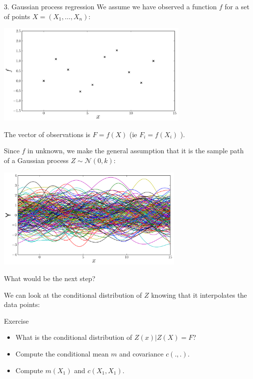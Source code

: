 \documentclass{beamer}
\begin{document}
\begin{frame}{3. Gaussian process regression}
We assume we have observed a function $f$ for a set of points $X = (X_1,\dots,X_n)$:
\begin{center}
\includegraphics[height=5cm]{figures/R/Fig1-data}
\end{center}
The vector of observations is $F=f(X)$ (ie $F_i = f(X_i)$ ).
\end{frame}

\begin{frame}{}
Since $f$ in unknown, we make the general assumption that
it is the sample path of a Gaussian process $Z \sim \mathcal{N}(0,k)$:
\begin{center}
\includegraphics[height=5cm]{figures/R/Fig1b-sim}
\end{center}
What would be the next step? 
\end{frame}

\begin{frame}{}
We can look at the conditional distribution of $Z$ knowing that it interpolates the data points: 
\begin{exampleblock}{Exercise}
\begin{itemize}
	\item[1.] What is the conditional distribution of $Z(x)|Z(X)=F$?
	\item[2.] Compute the conditional mean $m$ and covariance $c(.,.)$.
	\item[3.] Compute $m(X_1)$ and $c(X_1,X_1)$.
\end{itemize}
\end{exampleblock}
\end{frame}
\end{document}
